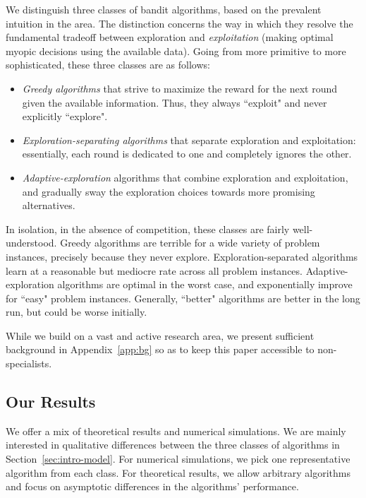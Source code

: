 We distinguish three classes of bandit algorithms, based on
the prevalent intuition in the area. The distinction concerns the way in which they resolve the fundamental tradeoff between  exploration and \emph{exploitation} (making optimal myopic decisions using the available data). Going from more primitive to more sophisticated, these three classes are as follows:

\begin{itemize}
\item \emph{Greedy algorithms} that strive to maximize the reward for the next round given the available information. Thus, they always ``exploit" and never explicitly ``explore".


\item \emph{Exploration-separating algorithms}
 that separate exploration and exploitation: essentially, each round is dedicated to one and completely ignores the other.

\item \emph{Adaptive-exploration} algorithms that combine exploration and exploitation, and gradually sway the exploration choices towards more promising alternatives.
\end{itemize}

In isolation, \ie in the absence of competition, these classes are fairly well-understood. Greedy algorithms are terrible for a wide variety of problem instances, precisely because they never explore. Exploration-separated algorithms learn at a reasonable but mediocre rate across all problem instances. Adaptive-exploration algorithms are optimal in the worst case, and exponentially improve for ``easy" problem instances. Generally,  ``better" algorithms are better in the long run, but could be worse initially.

While we build on a vast and active research area, we present sufficient background in Appendix~\ref{app:bg} so as to keep this paper accessible to non-specialists.


\subsection{Our Results}
\label{sec:intro-results}

We offer a mix of theoretical results and numerical simulations. We are mainly interested in qualitative differences between the three classes of algorithms in Section~\ref{sec:intro-model}. For numerical simulations, we pick one representative algorithm from each class. For theoretical results, we allow arbitrary algorithms and focus on asymptotic differences in the algorithms' performance.

